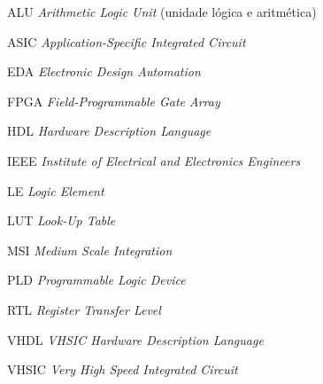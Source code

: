 \listoffigures*
\cleardoublepage
{}
\listoftables*
\cleardoublepage
\begin{siglas}

  \item[ALU] \textit {Arithmetic Logic Unit} (unidade lógica e aritmética)
  \item [ASIC] \textit {Application-Specific Integrated Circuit}
  \item [EDA] \textit {Electronic Design Automation}
  \item [FPGA] \textit {Field-Programmable Gate Array}
  \item [HDL] \textit {Hardware Description Language}
  \item [IEEE] \textit {Institute of Electrical and Electronics Engineers}
  \item [LE] \textit {Logic Element}
  \item [LUT] \textit {Look-Up Table}
  \item [MSI] \textit {Medium Scale Integration}
  \item [PLD] \textit {Programmable Logic Device}
  \item [RTL] \textit {Register Transfer Level}
  \item [VHDL] \textit {VHSIC Hardware Description Language}
  \item [VHSIC] \textit {Very High Speed Integrated Circuit}

\end{siglas}
\cleardoublepage
